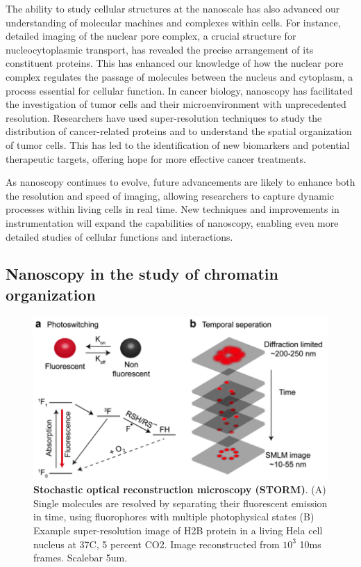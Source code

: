 The ability to study cellular structures at the nanoscale has also advanced our understanding of molecular machines and complexes within cells. For instance, detailed imaging of the nuclear pore complex, a crucial structure for nucleocytoplasmic transport, has revealed the precise arrangement of its constituent proteins. This has enhanced our knowledge of how the nuclear pore complex regulates the passage of molecules between the nucleus and cytoplasm, a process essential for cellular function. In cancer biology, nanoscopy has facilitated the investigation of tumor cells and their microenvironment with unprecedented resolution. Researchers have used super-resolution techniques to study the distribution of cancer-related proteins and to understand the spatial organization of tumor cells. This has led to the identification of new biomarkers and potential therapeutic targets, offering hope for more effective cancer treatments.

As nanoscopy continues to evolve, future advancements are likely to enhance both the resolution and speed of imaging, allowing researchers to capture dynamic processes within living cells in real time. New techniques and improvements in instrumentation will expand the capabilities of nanoscopy, enabling even more detailed studies of cellular functions and interactions.

\subsection{Nanoscopy in the study of chromatin organization}


\begin{figure}[t]
\centering
\includegraphics[width=12cm]{media/Intro.png}
\caption{\textbf{Stochastic optical reconstruction microscopy (STORM)}. (A) Single molecules are resolved by separating their fluorescent emission in time, using fluorophores with multiple photophysical states (B) Example super-resolution image of H2B protein in a living Hela cell nucleus at 37C, 5 percent CO2. Image reconstructed from $10^{3}$ 10ms frames. Scalebar 5um.}
\end{figure}

